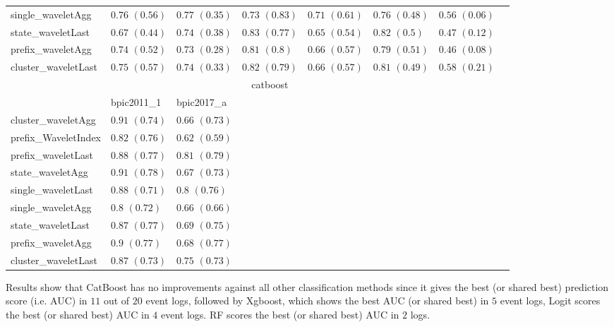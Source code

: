 \begin{table}[!htp]
{\begin{tabular}{llllllll}
			single\_waveletAgg & $\mathbf{0.76}$ $\mathbf{(0.56)}$  & $\mathbf{0.77}$ $\mathbf{(0.35)}$  & $0.73$ ${(0.83)}$ & $0.71$ ${(0.61)}$ & $0.76$ ${(0.48)}$ & $0.56$ ${(0.06)}$ \\
			state\_waveletLast & $0.67$ ${(0.44)}$ & $0.74$ ${(0.38)}$ & $0.83$ ${(0.77)}$ & $0.65$ ${(0.54)}$ & $0.82$ ${(0.5)}$ & $0.47$ ${(0.12)}$ \\
			prefix\_waveletAgg & $0.74$ ${(0.52)}$ & $0.73$ ${(0.28)}$ & $0.81$ ${(0.8)}$ & $0.66$ ${(0.57)}$ & $0.79$ ${(0.51)}$ & $0.46$ ${(0.08)}$ \\
			cluster\_waveletLast & $0.75$ ${(0.57)}$ & $0.74$ ${(0.33)}$ & $0.82$ ${(0.79)}$ & $0.66$ ${(0.57)}$ & $0.81$ ${(0.49)}$ & $\mathbf{0.58}$ $\mathbf{(0.21)}$  \\
			\bottomrule
			\toprule
			& \multicolumn{5}{c}{catboost}
			\\
			& bpic2011\_1 & bpic2017\_a
			\\ \midrule
			cluster\_waveletAgg & $0.91$ ${(0.74)}$ & $0.66$ ${(0.73)}$ \\
			prefix\_WaveletIndex & $0.82$ ${(0.76)}$ & $0.62$ ${(0.59)}$ \\
			prefix\_waveletLast & $0.88$ ${(0.77)}$ & $0.81$ ${(0.79)}$ \\
			state\_waveletAgg & $0.91$ ${(0.78)}$ & $0.67$ ${(0.73)}$ \\
			single\_waveletLast & $0.88$ ${(0.71)}$ & $0.8$ ${(0.76)}$ \\
			single\_waveletAgg & $0.8$ ${(0.72)}$ & $0.66$ ${(0.66)}$ \\
			state\_waveletLast & $0.87$ ${(0.77)}$ & $0.69$ ${(0.75)}$ \\
			prefix\_waveletAgg & $0.9$ ${(0.77)}$ & $0.68$ ${(0.77)}$ \\
			cluster\_waveletLast & $0.87$ ${(0.73)}$ & $0.75$ ${(0.73)}$ \\
			\bottomrule
			
		\end{tabular}%
	}
\end{table}


Results show that CatBoost has no improvements against all other classification methods since it gives the best (or shared best) prediction score (i.e. AUC) in $11$ out of $20$ event logs, followed by Xgboost, which shows the best AUC (or shared best) in $5$ event logs, Logit scores the best (or shared best) AUC in $4$ event logs. RF scores the best (or shared best) AUC in $2$ logs. 



